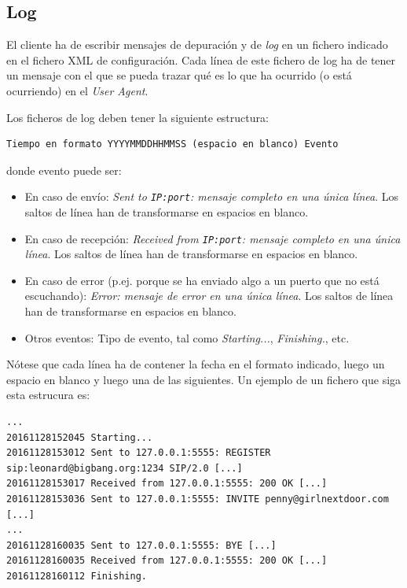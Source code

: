 \documentclass[a4paper,11pt]{article}
\begin{document}
\subsection{Log}


El cliente ha de escribir mensajes de depuración y de \emph{log} en un fichero indicado en el fichero XML de configuración. Cada línea de este fichero de log ha de tener un mensaje con el que se pueda trazar qué es lo que ha ocurrido (o está ocurriendo) en el \emph{User Agent}.

Los ficheros de log deben tener la siguiente estructura:


\begin{footnotesize}
\begin{verbatim}
Tiempo en formato YYYYMMDDHHMMSS (espacio en blanco) Evento
\end{verbatim}
\end{footnotesize}

donde evento puede ser:

\begin{itemize}
  \item En caso de envío: \emph{Sent to \texttt{IP:port}: mensaje completo en una única línea}. Los saltos de línea han de transformarse en espacios en blanco.
  \item En caso de recepción: \emph {Received from \texttt{IP:port}: mensaje completo en una única línea}. Los saltos de línea han de transformarse en espacios en blanco.
  \item En caso de error (p.ej. porque se ha enviado algo a un puerto que no está escuchando): \emph{Error: mensaje de error en una única línea}. Los saltos de línea han de transformarse en espacios en blanco.
  \item Otros eventos: Tipo de evento, tal como \emph{Starting...}, \emph{Finishing.}, etc.
\end{itemize}


Nótese que cada línea ha de contener la fecha en el formato indicado, luego
un espacio en blanco y luego una de las siguientes. Un ejemplo de un fichero que siga esta estrucura es:

\begin{footnotesize}
\begin{verbatim}
...
20161128152045 Starting...
20161128153012 Sent to 127.0.0.1:5555: REGISTER sip:leonard@bigbang.org:1234 SIP/2.0 [...]
20161128153017 Received from 127.0.0.1:5555: 200 OK [...]
20161128153036 Sent to 127.0.0.1:5555: INVITE penny@girlnextdoor.com [...]
...
20161128160035 Sent to 127.0.0.1:5555: BYE [...]
20161128160035 Received from 127.0.0.1:5555: 200 OK [...]
20161128160112 Finishing.
\end{verbatim}
\end{footnotesize}
\end{document}
